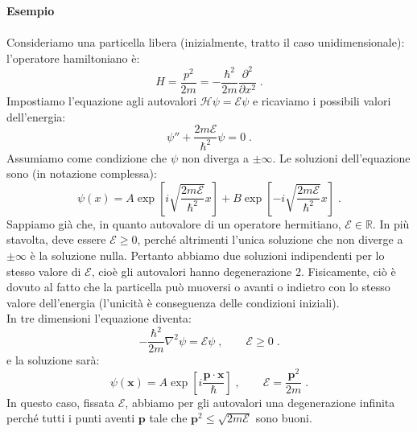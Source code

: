 \documentclass[12pt,a4paper]{report}
\theoremstyle{definition}
\newcommand{\ham}{\mathcal{H}}
\numberwithin{equation}{section}
\begin{document}
\textbf{Esempio} \\
\\
Consideriamo una particella libera (inizialmente, tratto il caso unidimensionale): l'operatore hamiltoniano è:
$$
H=\frac{p^2}{2m}=-\frac{\hbar^2}{2m}\frac{\partial^2}{\partial x^2}\;.
$$
Impostiamo l'equazione agli autovalori $\ham \psi=\mathcal{E}\psi$ e ricaviamo i possibili valori dell'energia:
$$
\psi''+\frac{2m\mathcal{E}}{\hbar^2}\psi=0\;.
$$
Assumiamo come condizione che $\psi$ non diverga a $\pm\infty$. Le soluzioni dell'equazione sono (in notazione complessa):
\begin{equation}
\psi(x)=A\exp\left[i\sqrt{\frac{2m\mathcal{E}}{\hbar^2}}x\right]+B\exp\left[-i\sqrt{\frac{2m\mathcal{E}}{\hbar^2}}x\right]\;.
\end{equation}
Sappiamo già che, in quanto autovalore di un operatore hermitiano, $\mathcal{E}\in\mathbb{R}$. In più stavolta, deve essere $\mathcal{E}\ge 0$, perché altrimenti l'unica soluzione che non diverge a $\pm\infty$ è la soluzione nulla. Pertanto abbiamo due soluzioni indipendenti per lo stesso valore di $\mathcal{E}$, cioè gli autovalori hanno degenerazione 2. Fisicamente, ciò è dovuto al fatto che la particella può muoversi o avanti o indietro con lo stesso valore dell'energia (l'unicità è conseguenza delle condizioni iniziali). \\
In tre dimensioni l'equazione diventa:
$$
-\frac{\hbar^2}{2m}\nabla^2\psi=\mathcal{E}\psi\;,\qquad \mathcal{E}\ge 0\;.
$$
e la soluzione sarà:
$$
\psi(\mathbf{x})=A\exp\left[i\frac{\mathbf{p}\cdot \mathbf{x}}{\hbar}\right]\;, \qquad \mathcal{E}=\frac{\mathbf{p}^2}{2m}\;.
$$
In questo caso, fissata $\mathcal{E}$, abbiamo per gli autovalori una degenerazione infinita perché tutti i punti aventi $\mathbf{p}$ tale che $\mathbf{p}^2\le \sqrt{2m\mathcal{E}}$ sono buoni.
\end{document}
